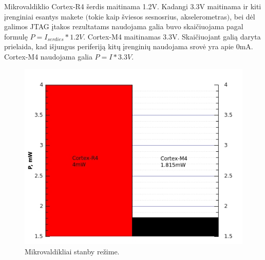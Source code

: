 \documentclass[a4paper, 12pt]{article} %
\begin{document}
\begin{onehalfspacing}
Mikrovaldiklio Cortex-R4 \v{s}erdis maitinama 1.2V. Kadangi 3.3V maitinama ir kiti \k{i}renginiai esantys makete $($tokie kaip \v{s}viesos sesnosrius, akselerometras$)$, bei d\.{e}l galimos JTAG \k{i}takos rezultatams naudojama galia buvo skai\v{c}iuojama pagal formul\k{e} $P=I_{serdies} *1.2V$. Cortex-M4 maitinamas 3.3V. Skai\v{c}iuojant gali\k{a} daryta prielaida, kad i\v{s}jungus periferij\k{a} kit\k{u} \k{i}rengini\k{u} naudojama srov\.{e} yra apie 0mA. Cortex-M4 naudojama galia $P=I*3.3V$.
\begin{figure}[H] %
\centering %
\includegraphics[scale=0.8]{pav/modes.jpg} %
\captionsetup{labelformat=numbfirst} %
\captionsetup{labelseparator=tarpas}
\caption{Mikrovaldikliai stanby re\v{z}ime.}
\label{vienas}
\end{figure}
\begin{figure}[H] %
\centering %

\end{figure}
\end{onehalfspacing}
\end{document}

